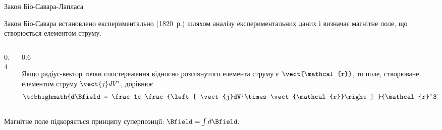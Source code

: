 \documentclass{beamer}
\begin{document}
\begin{frame}{Закон Біо-Савара-Лапласа}{}
	\begin{block}{}\justifying
		Закон Біо-Савара встановлено експериментально (1820~р.) шляхом аналізу
		експериментальних даних і \alert{визначає магнітне поле, що створюється елементом
			струму}.
	\end{block}
	\begin{columns}
		\begin{column}{0.4\linewidth}\centering
			
		\end{column}
		\begin{column}{0.6\linewidth}
			\begin{block}{}\justifying
				Якщо радіус-вектор точки спостереження відносно розглянутого елемента
				струму є $\vect{\mathcal{r}}$, то поле, створюване елементом струму
				$\vect{j} dV'$, дорівнює
				\begin{equation*}
					\tcbhighmath{d\Bfield = \frac1c \frac{\left[
								\vect{j}dV'\times\vect{\mathcal{r}}\right] }{\mathcal{r}^3}.}
				\end{equation*}
			\end{block}
		\end{column}
	\end{columns}
	\begin{alertblock}{}
		Магнітне поле підкоряється принципу суперпозиції: \( \Bfield = \int d\Bfield. \)
	\end{alertblock}
\end{frame}
\end{document}
